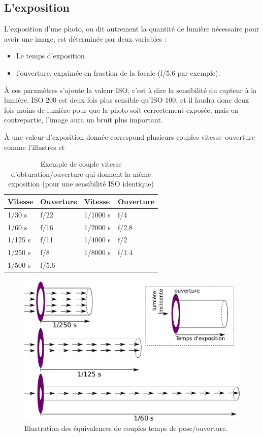 \documentclass[a4paper,twoside]{article}
\begin{document}
\subsection{L'exposition}
L'exposition d'une photo, ou dit autrement la quantité de lumière nécessaire pour avoir une image, est déterminée par deux variables : 
\begin{itemize}
\item Le temps d'exposition
\item l'ouverture, exprimée en fraction de la focale (f/5.6 par exemple).
\end{itemize}

À ces paramètres s'ajoute la valeur ISO, c'est à dire la sensibilité du capteur à la lumière. ISO 200 est deux fois plus sensible qu'ISO 100, et il faudra donc deux fois moins de lumière pour que la photo soit correctement exposée, mais en contrepartie, l'image aura un bruit plus important. 

À une valeur d'exposition donnée correspond plusieurs couples vitesse--ouverture comme l'illustres  et 

\begin{table}[htb]
\centering
\begin{tabular}{llll}
Vitesse & Ouverture & Vitesse & Ouverture\\\hline
1/30 s & f/22 & 1/1000 s & f/4\\
1/60 s & f/16 & 1/2000 s & f/2.8\\
1/125 s & f/11 & 1/4000 s & f/2\\
1/250 s & f/8 & 1/8000 s & f/1.4\\
1/500 s & f/5.6 
\end{tabular}
\caption{Exemple de couple vitesse d'obturation/ouverture qui donnent la même exposition (pour une sensibilité ISO identique)}\label{tab:exposition-equivalente}
\end{table}

\begin{figure}[htb]
\centering
\includegraphics[width=0.65\linewidth]{figure/exposition.pdf}
\caption{Illustration des équivalences de couples temps de pose/ouverture.}\label{fig:exposition-equivalente}
\end{figure}
\end{document}
